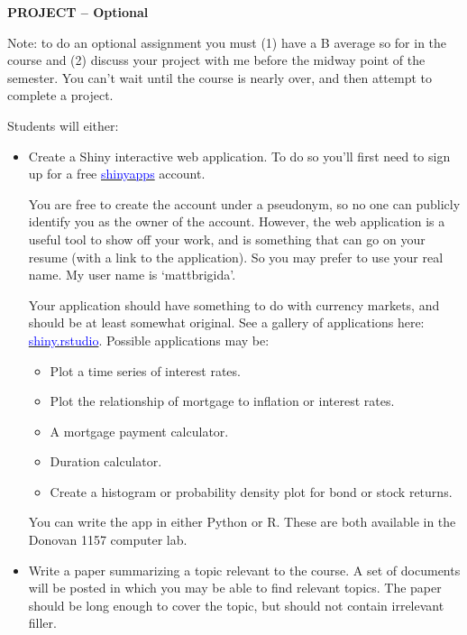 \documentclass{article}
\begin{document}
\begin{center}
{\bf PROJECT -- Optional}
\end{center}
Note:  to do an optional assignment you must (1) have a B average so for in the course and (2) discuss your project with me before the midway point of the semester.  You can't wait until the course is nearly over, and then attempt to complete a project.

Students will either:

\begin{itemize}
\item Create a Shiny interactive web application.  To do so you'll first need to sign up for a free \href{https://www.shinyapps.io/}{\textcolor{blue}{shinyapps}} account.  

You are free to create the account under a pseudonym, so no one can publicly identify you as the owner of the account.  However, the web application is a useful tool to show off your work, and is something that can go on your resume (with a link to the application).  So you may prefer to use your real name.  My user name is `mattbrigida'.  

Your application should have something to do with currency markets, and should be at least somewhat original.  See a gallery of applications here:  \href{http://shiny.rstudio.com/}{\textcolor{blue}{shiny.rstudio}}. Possible applications may be:
\begin{itemize}
\item Plot a time series of interest rates.
\item Plot the relationship of mortgage to inflation or interest rates.
\item A mortgage payment calculator.
\item Duration calculator.
\item Create a histogram or probability density plot for bond or stock returns.
\end{itemize}
You can write the app in either Python or R.  These are both available in the Donovan 1157 computer lab.

\item Write a paper summarizing a topic relevant to the course.  A set of documents will be posted in which you may be able to find relevant topics.  The paper should be long enough to cover the topic, but should not contain irrelevant filler.
\end{itemize}
\end{document}
